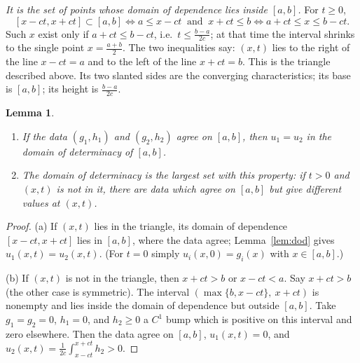 \documentclass[11pt]{article}
\theoremstyle{plain}
\newtheorem{lemma}[theorem]{Lemma}
\theoremstyle{definition}
\theoremstyle{remark}
\begin{document}
\emph{It is the set of points whose domain of dependence lies inside $[a,b]$.} For $t \ge 0$,
$$ [x - ct, x + ct] \subset [a,b] \iff a \leq x - ct \ \text{ and } \ x + ct \leq b \iff a + ct \leq x \leq b - ct. $$
Such $x$ exist only if $a + ct \leq b - ct$, i.e.\ $t \leq \frac{b - a}{2c}$; at that time the interval shrinks to the single point $x = \frac{a+b}{2}$. The two inequalities say: $(x,t)$ lies to the right of the line $x - ct = a$ and to the left of the line $x + ct = b$. This is the triangle described above. Its two slanted sides are the converging characteristics; its base is $[a,b]$; its height is $\frac{b-a}{2c}$.

\begin{lemma}\label{lem:dodet}
\begin{enumerate}
    \item[(a)] If the data $(g_1,h_1)$ and $(g_2,h_2)$ agree on $[a,b]$, then $u_1 = u_2$ in the domain of determinacy of $[a,b]$.
    \item[(b)] The domain of determinacy is the largest set with this property: if $t > 0$ and $(x,t)$ is not in it, there are data which agree on $[a,b]$ but give different values at $(x,t)$.
\end{enumerate}
\end{lemma}
\begin{proof}
(a) If $(x,t)$ lies in the triangle, its domain of dependence $[x - ct, x + ct]$ lies in $[a,b]$, where the data agree; Lemma~\ref{lem:dod} gives $u_1(x,t) = u_2(x,t)$. (For $t = 0$ simply $u_i(x,0) = g_i(x)$ with $x \in [a,b]$.)

(b) If $(x,t)$ is not in the triangle, then $x + ct > b$ or $x - ct < a$. Say $x + ct > b$ (the other case is symmetric). The interval $(\max\{b, x - ct\},\ x + ct)$ is nonempty and lies inside the domain of dependence but outside $[a,b]$. Take $g_1 = g_2 = 0$, $h_1 = 0$, and $h_2 \geq 0$ a $C^1$ bump which is positive on this interval and zero elsewhere. Then the data agree on $[a,b]$, $u_1(x,t) = 0$, and $u_2(x,t) = \frac{1}{2c}\int_{x-ct}^{x+ct}h_2 > 0$.
\end{proof}
\end{document}
